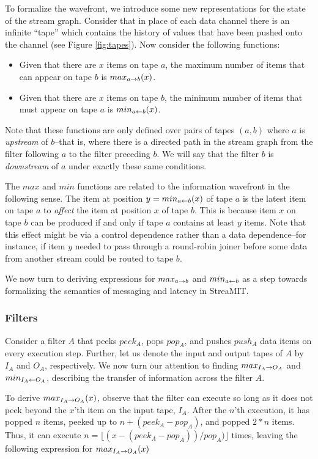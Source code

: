 To formalize the wavefront, we introduce some new representations for
the state of the stream graph.  Consider that in place of each data
channel there is an infinite ``tape'' which contains the history of
values that have been pushed onto the channel (see Figure
\ref{fig:tapes}).  Now consider the following functions:
\begin{itemize}
\item Given that there are $x$ items on tape $a$, the maximum number
of items that can appear on tape $b$ is $max_{a \rightarrow b}(x)$.

\item Given that there are $x$ items on tape $b$, the minimum number
of items that must appear on tape $a$ is $min_{a \leftarrow b}(x)$.
\end{itemize}
Note that these functions are only defined over pairs of tapes $(a,
b)$ where $a$ is {\it upstream} of $b$--that is, where there is a
directed path in the stream graph from the filter following $a$ to the
filter preceding $b$.  We will say that the filter $b$ is {\it
downstream} of $a$ under exactly these same conditions.

The $max$ and $min$ functions are related to the information wavefront
in the following sense.  The item at position $y = min_{a \leftarrow b}(x)$ of
tape $a$ is the latest item on tape $a$ to {\it affect} the item at
position $x$ of tape $b$.  This is because item $x$ on tape $b$ can be
produced if and only if tape $a$ contains at least $y$ items.  Note
that this effect might be via a control dependence rather than a data
dependence--for instance, if item $y$ needed to pass through a
round-robin joiner before some data from another stream could be
routed to tape $b$.

We now turn to deriving expressions for $max_{a \rightarrow b}$ and $min_{a \leftarrow b}$ as
a step towards formalizing the semantics of messaging and latency in
StreaMIT.

\subsubsection{Filters}

Consider a filter $A$ that peeks $peek_A$, pops $pop_A$, and pushes
$push_A$ data items on every execution step.  Further, let us denote
the input and output tapes of $A$ by $I_A$ and $O_A$, respectively.
We now turn our attention to finding $max_{I_A \rightarrow O_A}$ and
$min_{I_A \leftarrow O_A}$, describing the transfer of information across the
filter $A$.

To derive $max_{I_A \rightarrow O_A}(x)$, observe that the filter can execute so
long as it does not peek beyond the $x$'th item on the input tape,
$I_A$.  After the $n$'th execution, it has popped $n$ items, peeked up
to $n + (peek_A - pop_A)$, and popped $2 * n$ items.  Thus, it can
execute $n = \lfloor(x - (peek_A - pop_A)) / pop_A)\rfloor$ times, leaving
the following expression for $max_{I_A \rightarrow O_A}(x)$

